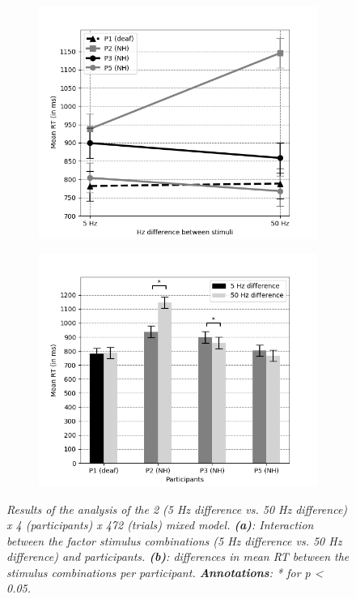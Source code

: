 \documentclass[12pt]{article}
\begin{document}
\begin{figure}[t!]
  \begin{subfigure}[h]{0.5\textwidth}
    \includegraphics[width=\textwidth]{5Hz_50Hz_interaction.png}
    \caption{}
    \label{fig:2a}
  \end{subfigure}
%
  \begin{subfigure}[h]{0.5\textwidth}
    \includegraphics[width=\textwidth]{5Hz_50Hz_all_bar.png}
    \caption{}
    \label{fig:2b}
  \end{subfigure}
\caption{\textit{\footnotesize{Results of the analysis of the 2 (5 Hz difference vs.  50 Hz difference) x 4 (participants) x 472 (trials) mixed
model. \textbf{(a)}: Interaction between the factor stimulus combinations (5 Hz difference vs. 50 Hz difference) and participants. \textbf{(b)}: differences in mean RT between the stimulus combinations per participant. \textbf{Annotations}: * for \textit{p} < 0.05.}}}
\end{figure}
\end{document}
